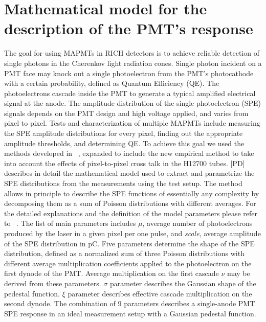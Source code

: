 \section{Mathematical model for the description of the PMT's response}

The goal for using MAPMTs in RICH detectors is to achieve reliable detection of single photons in the Cherenkov light radiation cones. Single photon incident on a PMT face may knock out a single photoelectron from the PMT's photocathode with a certain probability, defined as Quantum Efficiency (QE). The photoelectrons cascade inside the PMT to generate a typical amplified electrical signal at the anode. The amplitude distribution of the single photoelectron (SPE) signals depends on the PMT design and high voltage applied, and varies from pixel to pixel. Tests and characterization of multiple MAPMTs include measuring the SPE amplitude distributions for every pixel, finding out the appropriate amplitude thresholds, and determining QE. To achieve this goal we used the methods developed in ~\cite{DEGTIARENKO20171}, expanded to include the new empirical method to take into account the effects of pixel-to-pixel cross talk in the H12700 tubes. [PD] describes in detail the mathematical model used to extract and parametrize the SPE distributions from the measurements using the test setup. The method allows in principle to describe the SPE functions of essentially any complexity by decomposing them as a sum of Poisson distributions with different averages. For the detailed explanations and the definition of the model parameters please refer to ~\cite{DEGTIARENKO20171}. The list of main parameters includes $\mu$, average number of photoelectrons produced by the laser in a given pixel per one pulse, and {\it{scale}}, average amplitude of the SPE distribution in pC. Five parameters determine the shape of the SPE distribution, defined as a normalized sum of three Poisson distributions with different average multiplication coefficients applied to the photoelectron on the first dynode of the PMT. Average multiplication on the first cascade ${\nu}$ may be derived from these parameters. ${\sigma}$ parameter describes the Gaussian shape of the pedestal function. ${\xi}$ parameter describes effective cascade multiplication on the second dynode. The combination of 9 parameters describes a single-anode PMT SPE response in an ideal measurement setup with a Gaussian pedestal function. 

